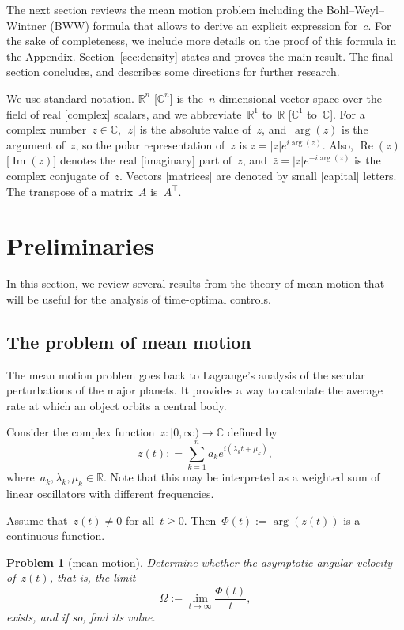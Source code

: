 \documentclass[final ]{IEEEtran}
\newcommand{\real}{\operatorname{Re}}
\newcommand{\imag}{\operatorname{Im}}
\newtheorem{problem}{Problem}
\newcommand {\R}{\mathbb R}
\newcommand {\C}{\mathbb C}
\newcommand{\be}{\begin{equation}}
\newcommand{\ee}{\end{equation}}
\begin{document}
The next section  reviews the mean motion problem  including the  Bohl–Weyl–Wintner (BWW) formula that allows to derive an explicit expression for~$c$.
For the sake of completeness,   we include more details 
on the proof  of this formula in the Appendix.
Section~\ref{sec:density}
 states and proves  the main result. 
 The final section concludes, and describes some directions for further research.


We use standard notation.
$\R^n$ [$\C^n$]
is the~$n$-dimensional vector space over the field of real [complex] scalars, and we abbreviate~$\R^1$ to~$\R$ [$\C^1$ to~$\C$].
For a complex
number~$z\in\C$, $|z|$ is the absolute value of~$z$,
and~$ \arg (z)$ is the argument of~$z$, so the polar representation of~$z$ is
$z=|z| e^{i\arg (z)}$. Also,
  $\real(z)$  [$\imag(z)$] denotes the  real [imaginary] part of~$z$,  and~$\bar z=|z| e^{-i\arg (z)}$ is the complex conjugate   of~$z$.
Vectors [matrices] are denoted by small [capital] letters.
The transpose of a matrix~$A$ is~$A^\top$.


\section{Preliminaries}
In this section, we
review several results
from the theory of mean motion that will be useful for the analysis of time-optimal controls.

\subsection{The problem of mean motion}
The mean motion problem
goes back to Lagrange's analysis of the secular perturbations of the major planets.
It provides a way to calculate the average rate at which an object orbits a central body.


Consider the complex function~$z:[0,\infty)\to \C$ defined by
  \begin{equation}\label{eq:rotating}
z(t) : =\sum_{k=1}^n a_k e^{i(\lambda_k t+\mu_k)} ,
\end{equation}
where~$a_k,\lambda_k,\mu_k\in \R$.
Note that this may be interpreted as a weighted sum of linear oscillators with different frequencies. 

Assume that~$z(t)\not =0$ for all~$t\geq 0$.
Then~$\Phi(t):=\arg( z(t))$ is a continuous function.  
\begin{problem}[mean motion]\label{prob:mean_motion}
Determine whether the asymptotic angular velocity of~$z(t)$, that is, the   limit  
 \be\label{eq:def_omeha}
 \Omega:=\lim_{t\to \infty}\frac{\Phi(t)}{t},
 \ee
   exists, and if so,   find  its value.
\end{problem}
\end{document}

